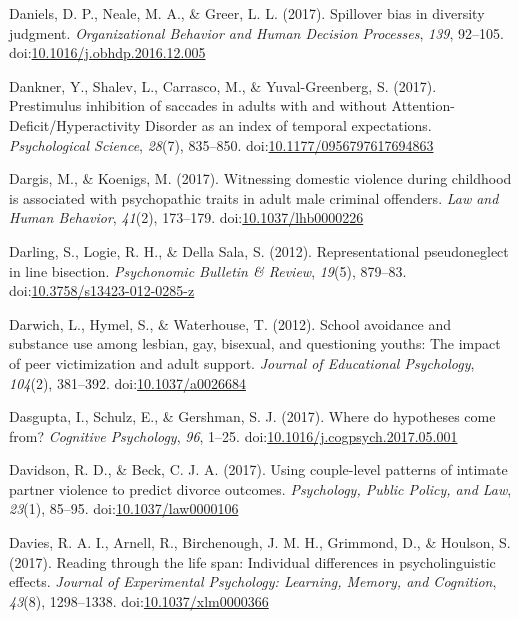 \documentclass[english,man]{apa6}
\begin{document}
\hypertarget{ref-Daniels2017}{}
Daniels, D. P., Neale, M. A., \& Greer, L. L. (2017). Spillover bias in
diversity judgment. \emph{Organizational Behavior and Human Decision
Processes}, \emph{139}, 92--105.
doi:\href{https://doi.org/10.1016/j.obhdp.2016.12.005}{10.1016/j.obhdp.2016.12.005}

\hypertarget{ref-Dankner2017}{}
Dankner, Y., Shalev, L., Carrasco, M., \& Yuval-Greenberg, S. (2017).
Prestimulus inhibition of saccades in adults with and without
Attention-Deficit/Hyperactivity Disorder as an index of temporal
expectations. \emph{Psychological Science}, \emph{28}(7), 835--850.
doi:\href{https://doi.org/10.1177/0956797617694863}{10.1177/0956797617694863}

\hypertarget{ref-Dargis2017}{}
Dargis, M., \& Koenigs, M. (2017). Witnessing domestic violence during
childhood is associated with psychopathic traits in adult male criminal
offenders. \emph{Law and Human Behavior}, \emph{41}(2), 173--179.
doi:\href{https://doi.org/10.1037/lhb0000226}{10.1037/lhb0000226}

\hypertarget{ref-Darling2012}{}
Darling, S., Logie, R. H., \& Della Sala, S. (2012). Representational
pseudoneglect in line bisection. \emph{Psychonomic Bulletin \& Review},
\emph{19}(5), 879--83.
doi:\href{https://doi.org/10.3758/s13423-012-0285-z}{10.3758/s13423-012-0285-z}

\hypertarget{ref-Darwich2012}{}
Darwich, L., Hymel, S., \& Waterhouse, T. (2012). School avoidance and
substance use among lesbian, gay, bisexual, and questioning youths: The
impact of peer victimization and adult support. \emph{Journal of
Educational Psychology}, \emph{104}(2), 381--392.
doi:\href{https://doi.org/10.1037/a0026684}{10.1037/a0026684}

\hypertarget{ref-Dasgupta2017}{}
Dasgupta, I., Schulz, E., \& Gershman, S. J. (2017). Where do hypotheses
come from? \emph{Cognitive Psychology}, \emph{96}, 1--25.
doi:\href{https://doi.org/10.1016/j.cogpsych.2017.05.001}{10.1016/j.cogpsych.2017.05.001}

\hypertarget{ref-Davidson2017}{}
Davidson, R. D., \& Beck, C. J. A. (2017). Using couple-level patterns
of intimate partner violence to predict divorce outcomes.
\emph{Psychology, Public Policy, and Law}, \emph{23}(1), 85--95.
doi:\href{https://doi.org/10.1037/law0000106}{10.1037/law0000106}

\hypertarget{ref-Davies2017}{}
Davies, R. A. I., Arnell, R., Birchenough, J. M. H., Grimmond, D., \&
Houlson, S. (2017). Reading through the life span: Individual
differences in psycholinguistic effects. \emph{Journal of Experimental
Psychology: Learning, Memory, and Cognition}, \emph{43}(8), 1298--1338.
doi:\href{https://doi.org/10.1037/xlm0000366}{10.1037/xlm0000366}
\end{document}
